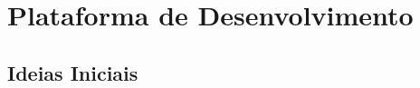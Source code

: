 
\chapter{Plataforma de Desenvolvimento}
\label{cap:plataforma de desenvolvimento}
\section{Ideias Iniciais}


